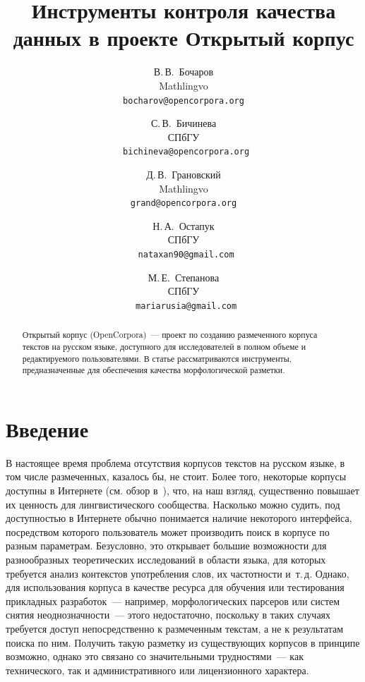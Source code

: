 \documentclass[a4paper]{article}
\begin{document}
\author{В.\,В.~Бочаров\\\small Mathlingvo\\\small\tt bocharov@opencorpora.org\and С.\,В.~Бичинева\\\small СПбГУ\\\small\tt\ bichineva@opencorpora.org\and Д.\,В.~Грановский\\\small Mathlingvo\\\small\tt grand@opencorpora.org\and Н.\,А.~Остапук\\\small СПбГУ\\\small\tt\ nataxan90@gmail.com\and М.\,Е.~Степанова\\\small СПбГУ\\\small\tt\ mariarusia@gmail.com}
\title{Инструменты контроля качества данных в проекте Открытый корпус}
\date{}
\maketitle
\begin{abstract}
Открытый корпус (OpenCorpora)~--- проект по созданию размеченного корпуса текстов на русском языке, доступного для исследователей в полном объеме и редактируемого пользователями. В статье рассматриваются инструменты, предназначенные для обеспечения качества морфологической разметки.
\end{abstract}
\section{Введение}
В настоящее время проблема отсутствия корпусов текстов на русском языке, в том числе размеченных, казалось бы, не стоит. Более того, некоторые корпусы доступны в Интернете (см. обзор в~\cite{reznikova05}), что, на наш взгляд, существенно повышает их ценность для лингвистического сообщества. Насколько можно судить, под доступностью в Интернете обычно понимается наличие некоторого интерфейса, посредством которого пользователь может производить поиск в корпусе по разным параметрам. Безусловно, это открывает большие возможности для разнообразных теоретических исследований в области языка, для которых требуется анализ контекстов употребления слов, их частотности и~т.\,д. Однако, для использования корпуса в качестве ресурса для обучения или тестирования прикладных разработок~--- например, морфологических парсеров или систем снятия неоднозначности~--- этого недостаточно, поскольку в таких случаях требуется доступ непосредственно к размеченным текстам, а не к результатам поиска по ним. Получить такую разметку из существующих корпусов в принципе возможно, однако это связано со значительными трудностями~--- как технического, так и административного или лицензионного характера.
\end{document}
